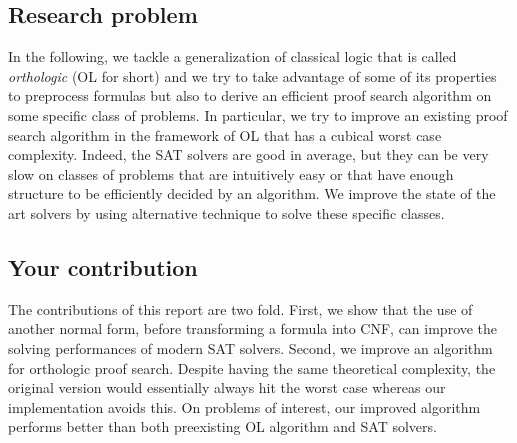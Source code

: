 \documentclass[a4paper, 11pt]{article}
\begin{document}

	\subsection*{Research problem}
	In the following, we tackle a generalization of classical logic that is called 
	\textit{orthologic} (OL for short) and we try to take advantage of
	some of its properties to preprocess formulas but also to derive an efficient proof search 
	algorithm on some specific class of problems. In particular, we try to improve an existing 
	proof search algorithm in the framework of OL
	that has a cubical worst case complexity. Indeed, the SAT solvers are good in average, but they 
	can be very slow on classes of
	problems that are intuitively easy or that have enough structure to be efficiently decided by an
	algorithm. We improve the state of the art solvers by using alternative technique to solve these
	specific classes. 


	\subsection*{Your contribution}
	The contributions of this report are two fold. First, we show that the use of another normal
	form, before transforming a formula into CNF, can improve the solving performances of modern SAT 
	solvers.
	Second, we improve an algorithm for orthologic proof search. Despite having the same
	theoretical complexity, the original version would essentially always hit the worst case whereas
	our implementation avoids this. On problems of interest, our improved algorithm performs better 
	than both preexisting OL algorithm and SAT solvers.
\end{document}
